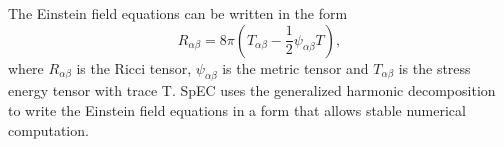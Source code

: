 %
The Einstein field equations can be written in the form
%
\begin{equation}
  \label{eqn:efe}
R_{\alpha\beta} = 8\pi\left(T_{\alpha\beta} - \frac{1}{2}\psi_{\alpha\beta}T\right),
\end{equation}
%
where $R_{\alpha\beta}$ is the Ricci tensor, $\psi_{\alpha\beta}$ is the metric tensor and $T_{\alpha\beta}$ is the stress energy tensor with trace T. SpEC uses the generalized harmonic decomposition \cite{lindblom2006} to write the Einstein field equations in a form that allows stable numerical computation.

